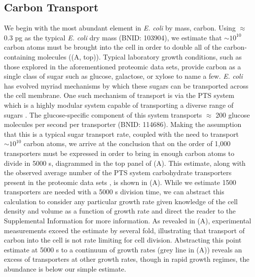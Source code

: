 \subsection{Carbon Transport}
We begin with the most abundant element in \textit{E. coli}
by mass, carbon. Using $\approx$ 0.3 pg as the typical \textit{E. coli} dry
mass (BNID: 103904), we estimate that $\sim 10^{10}$
carbon atoms must be brought into the cell in order to double all of the
carbon-containing molecules ((A, top)). Typical laboratory
growth conditions, such as those explored in the aforementioned proteomic
data sets, provide carbon as a single class of sugar such as glucose,
galactose, or xylose to name a few. \textit{E. coli} has evolved myriad
mechanisms by which these sugars can be transported across the cell membrane.
One such mechanism of transport is via the PTS system which is a highly
modular system capable of transporting a diverse range of sugars
\citep{escalante2012}. The glucose-specific component of this system
transports $\approx$ 200 glucose molecules per second per transporter (BNID:
114686). Making the assumption that this is a typical sugar
transport rate, coupled with the need to transport $\sim 10^{10}$ carbon atoms, we
arrive at the conclusion that on the order of 1,000 transporters must be
expressed in order to bring in enough carbon atoms to divide in 5000 s,
diagrammed in the top panel of (A). This estimate, along
with the observed average number of the PTS system carbohydrate transporters present in the
proteomic data sets \citep{schmidt2016, peebo2015,valgepea2013,li2014}, is
shown in (A). While we estimate 1500 transporters are
needed with a 5000 s division time, we can abstract this calculation to consider
any particular growth rate given knowledge of the cell density and volume as a
function of growth rate and direct the reader to the Supplemental Information for more information. As
revealed in (A), experimental measurements exceed the estimate
by several fold, illustrating that transport of carbon into the cell is not
rate limiting for cell division. Abstracting this point estimate at 5000 s to a
continuum of growth rates (grey line in (A)) reveals an excess
of transporters at other growth rates, though in rapid growth regimes, the
abundance is below our simple estimate.
